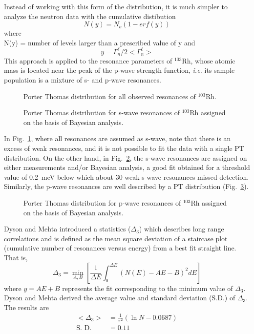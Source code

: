 \documentclass[twocolumn,amsmath,amssymb,10pt,groupedaddress,a4paper]{revtex4}
\begin{document}
Instead of working with this form of the distribution,  it is much simpler to
analyze the neutron data with the cumulative distibution
\begin{equation}
N(y)= N_o(1-erf(y))
\end{equation}
\noindent where\\
 N(y) = number of levels larger than a prescribed  value of y and
\begin{equation}
 y = \Gamma_n^\ell/2< \Gamma_n^\ell >
\end{equation}
This approach is applied to the resonance parameters of $^{103}$Rh, whose
atomic mass is located near the peak of the p-wave  strength function, {\it i.e.}
its sample population is a mixture of s- and p-wave resonances.
\begin{figure}[htbp]
\caption{Porter Thomas distribution for all observed resonances of $^{103}$Rh.}
\label{rh103pt}
\end{figure}
\begin{figure}[htbp]
\caption{Porter Thomas distribution for s-wave resonances of $^{103}$Rh assigned on the basis of Bayesian analysis.}
\label{rh103s}
\end{figure}

In Fig.~\ref{rh103pt}, where all resonances are assumed as s-wave, note that
there is an excess of weak resonances, and it is not possible to fit the data
with a single PT distribution. On the other hand, in Fig.~\ref{rh103s}, the s-wave resonances
are assigned on either  measurements and/or  Bayesian analysis, a good fit
obtained for a threshold value of 0.2~meV below which about 30 weak s-wave
resonances missed detection. Similarly, the p-wave resonances are well described
by a PT distribution (Fig.~\ref{rh103p}).
\begin{figure}[htbp]
\caption{Porter Thomas distribution for p-wave resonances of $^{103}$Rh assigned on the basis of Bayesian analysis.}
\label{rh103p}
\end{figure}

Dyson and Mehta \cite{dyson:63} introduced a statistics ($\Delta_3$) which describes long range correlations and is defined as the mean square deviation of a staircase plot (cumulative number of resonances versus
energy) from a best fit straight line. That is,
\begin{equation}   \Delta_3 = \min_{A,B} \left[ \frac{1}{\Delta E} \int_0^{\Delta E} (N(E) - AE - B)^2 dE \right]
\label{delta3}
\end{equation}
\noindent where $y = AE + B$ represents the fit corresponding to the minimum value of $\Delta_3$.  Dyson and Mehta \cite{dyson:63} derived the average value
and standard deviation (S.D.) of  $\Delta_3$.   The results are
\begin{equation}
\begin{aligned}
<\Delta_3> &= \frac{1}{\pi^2} (\ln N - 0.0687)  \\
 \text{S. D.}&= 0.11
\label{delta33}
\end{aligned}
\end{equation}
\end{document}
